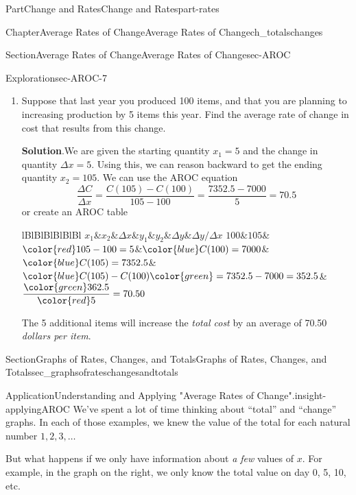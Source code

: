 \documentclass[oneside,10pt,]{tufte-book}
\newcommand{\blocktitlefont}{\relax}
\newcommand{\tabularfont}{\relax}
\numberwithin{equation}{chapter}
\newcommand{\hrulemedium}{\noalign{\hrule height 0.07em}}
\begin{document}
\begin{partptx}{Part}{Change and Rates}{}{Change and Rates}{}{}{part-rates}
\begin{chapterptx}{Chapter}{Average Rates of Change}{}{Average Rates of Change}{}{}{ch_totalschanges}
\begin{sectionptx}{Section}{Average Rates of Change}{}{Average Rates of Change}{}{}{sec-AROC}
\begin{exploration}{Exploration}{}{sec-AROC-7}
\begin{enumerate}[font=\bfseries,label=(\alph*),ref=\alph*]
\begin{center}
{}%
\end{center}%
%
\item{}Suppose that last year you produced 100 items, and that you are planning to increasing production by 5 items this year. Find the average rate of change in cost that results from this change.%
\par\smallskip%
\noindent\textbf{\blocktitlefont Solution}.\hypertarget{sec-AROC-7-4-2}{}\quad{}We are given the starting quantity \(x_1 = 5\) and the change in quantity \(\Delta x = 5\).  Using this, we can reason backward to get the ending quantity \(x_2 = 105\). We can use the AROC equation%
\begin{equation*}
\dfrac{\Delta C}{\Delta x} = \dfrac{C(105) - C(100)}{105-100} = \dfrac{7352.5 - 7000}{5} = 70.5
\end{equation*}
or create an AROC table \begin{center}%
{\tabularfont%
\begin{tabular}{lBlBlBlBlBlBl}
\(x_1\)&\(x_2\)&\(\Delta x\)&\(y_1\)&\(y_2\)&\(\Delta y\)&\(\Delta y/\Delta x\)\tabularnewline\hrulemedium
\(100\)&\(105\)&\(\color{red} 	105 - 100 = 5\)&\(\color{blue} C(100) = 7000\)&\(\color{blue} C(105) = 7352.5\)&\(\color{blue} C(105) - C(100) \color{green} =  7352.5 - 7000 = 352.5\)&\(\dfrac{\color{green} 362.5}{\color{red} 5} =  70.50 \)
\end{tabular}
}%
\end{center}%
 The 5 additional items will increase the \emph{total cost} by an average of 70.50 \emph{dollars per item}.%
\end{enumerate}%
\end{exploration}%
\end{sectionptx}
%
%
\typeout{************************************************}
\typeout{************************************************}
%
\begin{sectionptx}{Section}{Graphs of Rates, Changes, and Totals}{}{Graphs of Rates, Changes, and Totals}{}{}{sec_graphsofrateschangesandtotals}
\begin{insight}{Application}{Understanding and Applying "Average Rates of Change".}{insight-applyingAROC}%
We've spent a lot of time thinking about ``total'' and ``change'' graphs. In each of those examples, we knew the value of the total for each natural number \(1,2,3,\dots\)%
\par
But what happens if we only have information about \emph{a few} values of \(x\). For example, in the graph on the right, we only know the total value on day 0, 5, 10, etc.%

\end{insight}
\end{sectionptx}
\end{chapterptx}
\end{partptx}
\end{document}
